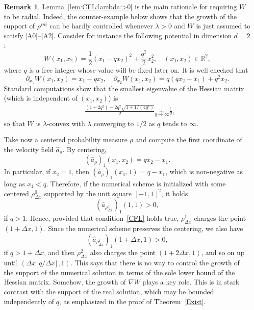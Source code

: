 \documentclass[11pt]{article}
\theoremstyle{definition}
\newtheorem{rema}[theo]{Remark}
\numberwithin{equation}{section}
\newcommand*\RR{\mathbb{R}}
\newcommand*\achapo{\widehat{a}}
\begin{document}
\begin{rema}
Lemma~\ref{lem:CFL:lambda:>0} is the main rationale for requiring $W$ to be radial. Indeed, the counter-example below shows that the growth of the support of $\rho^{ini}$ can be hardly controlled whenever $\lambda >0$ and $W$ is just assumed to satisfy
\eqref{A0}--\eqref{A2}. Consider for instance the following potential in dimension $d=2$:
\begin{equation*}
W(x_{1},x_{2}) = \frac12 (x_{1} - q x_{2} )^2 + \frac{q^2}2 x_{2}^2, \quad (x_{1},x_{2}) \in \RR^2,
\end{equation*}
where $q$ is a free integer whose value will be fixed later on. It is well checked that
\begin{equation*}
\partial_{x_{1}} W(x_{1},x_{2}) = x_{1}- q x_{2},
\quad \partial_{x_{2}} W(x_{1},x_{2}) = q (q x_{2} - x_{1}) + q^2 x_{2}.
\end{equation*}
Standard computations show that the smallest eigenvalue of the Hessian matrix (which is independent of $(x_{1},x_{2})$) is
\begin{equation*}
\begin{split}
&\frac{(1+2q^2) - 2q^2 \sqrt{1+1/(4q^4)}}{2} \underset{q \rightarrow \infty}{\sim} \frac12,
\end{split}
\end{equation*}
so that $W$ is $\lambda$-convex with $\lambda$ converging to $1/2$ as $q$ tends to $\infty$.

Take now a centered probability measure $\rho$ and compute the first coordinate of the velocity field $\achapo_{\rho}$. By centering,
\begin{equation*}
(\achapo_{\rho})_{1}(x_{1},x_{2}) = qx_{2}- x_{1}.
\end{equation*}
In particular, if $x_{2}=1$, then $(\achapo_{\rho})_{1}(x_{1},1) = q- x_{1}$, which is non-negative as long as $x_{1}< q$. Therefore, if the numerical scheme is initialized with some centered $\rho^0_{\Delta x}$ supported by the unit square $[-1,1]^2$, it holds
\begin{equation*}
(\achapo_{\rho^0_{\Delta x}})_{1}(1,1) >0,
\end{equation*}
if $q>1$. Hence, provided that condition~\eqref{CFL} holds true, $\rho^{1}_{\Delta x}$ charges the point $(1+\Delta x,1)$. Since the numerical scheme preserves the centering, we also have
\begin{equation*}
(\achapo_{\rho^1_{\Delta x}})_{1}(1+\Delta x,1) >0,
\end{equation*}
if $q>1+\Delta x$, and then $\rho^2_{\Delta x}$ also charges the point $(1+2\Delta x,1)$, and so on up until $(\Delta x \lfloor q/\Delta x \rfloor,1)$. This says that there is no way to control the growth of the support of the numerical solution in terms of the sole lower bound of the Hessian matrix. Somehow, the growth of $\nabla W$ plays a key role. This is in stark contrast with the support of the real solution, which may be bounded independently of $q$, as emphasized in the proof of Theorem~\ref{Exist}.


\end{rema}
\end{document}
